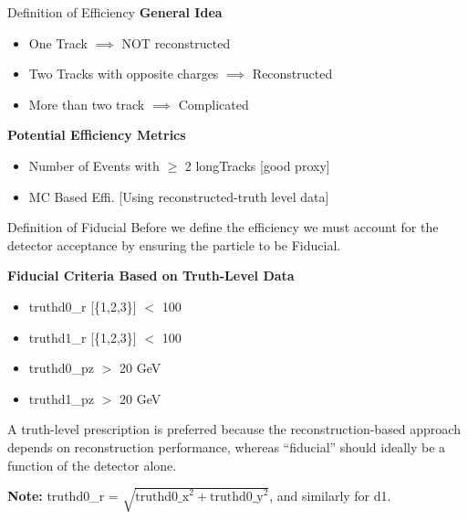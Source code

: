 \begin{frame}{Definition of Efficiency}
    \textbf{General Idea}
	\begin{itemize}

        \item One Track $\implies$ NOT reconstructed
        \item Two Tracks with opposite charges $\implies$ Reconstructed 
        \item More than two track $\implies$ Complicated
    \end{itemize}
    \vspace{1 cm}
    \textbf{Potential Efficiency Metrics}
    \begin{itemize}
        \item Number of Events with $\geq$ 2 longTracks [good proxy]
        \item MC Based Effi. [Using reconstructed-truth level data]
    \end{itemize}
\end{frame}

\begin{frame}{Definition of Fiducial}
    Before we define the efficiency we must account for the detector acceptance by ensuring the particle to be Fiducial.

    \vspace{0.5cm}
		\textbf{Fiducial Criteria Based on Truth-Level Data}
		\begin{itemize}
			\item truthd0\_r [\{1,2,3\}] $<$ 100
			\item truthd1\_r [\{1,2,3\}] $<$ 100
			\item truthd0\_pz $>$ 20 GeV
			\item truthd1\_pz $>$ 20 GeV	
		\end{itemize}

        \vspace{0.3cm}
        {\small
        A truth-level prescription is preferred because the reconstruction-based approach depends on reconstruction performance, whereas ``fiducial'' should ideally be a function of the detector alone.}

        \vspace{0.2cm}

        {\scriptsize
            \textbf{Note:} truthd0\_r = $\sqrt{\text{truthd0\_x}^2 + \text{truthd0\_y}^2}$, and similarly for d1.

        }
\end{frame}


